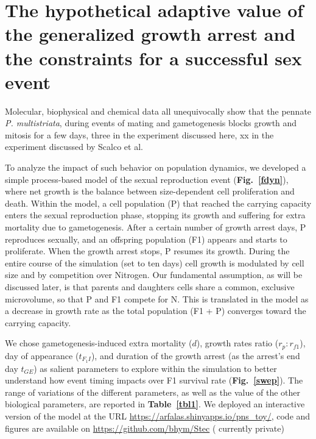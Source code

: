 \documentclass[a4paper,oneside]{book}
\begin{document}
  \section*{The hypothetical adaptive value of the generalized growth arrest and the constraints for a successful sex event}
    Molecular, biophysical and chemical data all unequivocally show that the pennate \textit{P. multistriata}, during events of mating and gametogenesis blocks growth and mitosis for a few days, three in the experiment discussed here, xx in the experiment discussed by Scalco et al.

    To analyze the impact of such behavior on population dynamics, we developed a simple process-based model of the sexual reproduction event (\textbf{Fig.~\ref{fdyn}}), where net growth is the balance between size-dependent cell proliferation and death.
    Within the model, a cell population (P) that reached the carrying capacity enters the sexual reproduction phase, stopping its growth and suffering for extra mortality due to gametogenesis.
    After a certain number of growth arrest days, P reproduces sexually, and an offspring population (F1) appears and starts to proliferate.
    When the growth arrest stops, P resumes its growth.
    During the entire course of the simulation (set to ten days) cell growth is modulated by cell size and by competition over Nitrogen.
    Our fundamental assumption, as will be discussed later, is that parents and daughters cells share a common, exclusive microvolume, so that P and F1 compete for N. This is translated in the model as a decrease in growth rate as the total population (F1 + P) converges toward the carrying capacity.

    We chose gametogenesis-induced extra mortality ($d$), growth rates ratio ($r_p:r_{f1}$), day of appearance ($t_{F_{1}I}$), and duration of the growth arrest (as the arrest's end day $t_{GE}$) as salient parameters to explore within the simulation to better understand how event timing impacts over F1 survival rate (\textbf{Fig.~\ref{swep}}).
    The range of variations of the different parameters, as well as the value of the other biological parameters, are reported in \textbf{Table~\ref{tbl1}}.
    We deployed an interactive version of the model at the URL \url{https://arfalas.shinyapps.io/pns_toy/}, code and figures are available on \url{https://github.com/bhym/Stec} ({\color{red} currently private})
\end{document}

